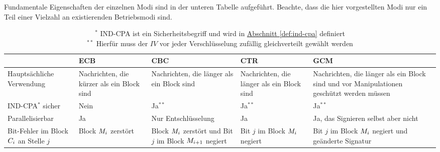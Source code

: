 Fundamentale Eigenschaften der einzelnen Modi sind in der unteren Tabelle aufgeführt. Beachte, dass die hier vorgestellten Modi nur ein Teil einer Vielzahl an existierenden Betriebsmodi sind.
\begin{table}[h]
	\captionsetup{labelformat=empty}
	\captionsetup{singlelinecheck=false}
	\captionsetup{font=footnotesize}
	\centering
	\begin{tabularx}{\textwidth}{ | >{\raggedright\arraybackslash}X | >{\raggedright\arraybackslash}X | >{\raggedright\arraybackslash}X | >{\raggedright\arraybackslash}X | >{\raggedright\arraybackslash}X |} 
		\hline
		& ECB & CBC & CTR & GCM\\ 
		\hline
		Hauptsächliche Verwendung & Nachrichten, die kürzer als ein Block sind & Nachrichten, die länger als ein Block sind
		& Nachrichten, die länger als ein Block sind & Nachrichten, die länger als ein Block sind und vor Manipulationen geschützt werden müssen\\ 
		\hline
		\parbox{3cm}{IND-CPA\(^{\ast}\) } sicher & Nein & Ja$^{\ast\ast}$ & Ja$^{\ast\ast}$ & Ja$^{\ast\ast}$\\
		\hline
		 Parallelisierbar & Ja & Nur Entschlüsselung  & Ja & Ja, das Signieren selbst aber nicht\\ 
		\hline
		Bit-Fehler im Block $C_i$ an Stelle $j$ & Block $M_i$ zerstört & Block $M_i$ zerstört und Bit $j$ im Block $M_{i+1}$ negiert 
		& Bit $j$ im Block $M_i$ negiert & Bit $j$ im Block $M_i$ negiert und geänderte Signatur\\
		\hline
	\end{tabularx}
	\caption{$^{\ast}$ IND-CPA ist ein Sicherheitsbegriff und wird in \hyperref[def:ind-cpa]{Abschnitt \ref{def:ind-cpa}} definiert\\ 
		$^{\ast\ast}$ Hierfür muss der $IV$ vor jeder Verschlüsselung zufällig gleichverteilt gewählt werden}
\end{table}
